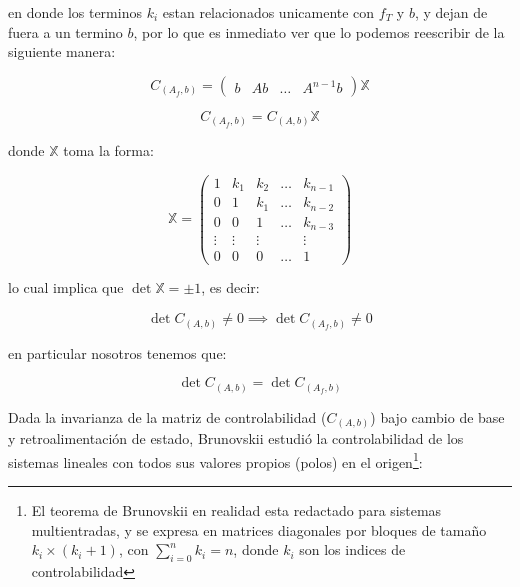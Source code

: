 \begin{enumerate}
                en donde los terminos $k_i$ estan relacionados unicamente con $f_T$ y $b$, y dejan de fuera a un termino $b$, por lo que es inmediato ver que lo podemos reescribir de la siguiente manera:

                \begin{equation*}
                    C_{(A_f, b)} =
                    \begin{pmatrix}
                    b & A b & \dots & A^{n-1} b
                    \end{pmatrix} \mathbb{X}
                \end{equation*}

                \begin{equation}
                    C_{(A_f, b)} = C_{(A, b)} \mathbb{X}
                \end{equation}

                donde $\mathbb{X}$ toma la forma:

                \begin{equation*}
                    \mathbb{X} =
                    \begin{pmatrix}
                        1 & k_1 & k_2 & \dots & k_{n-1} \\
                        0 & 1 & k_1 & \dots & k_{n-2} \\
                        0 & 0 & 1 & \dots & k_{n-3} \\
                        \vdots & \vdots & \vdots & & \vdots \\
                        0 & 0 & 0 & \dots & 1
                    \end{pmatrix}
                \end{equation*}

                lo cual implica que $\det{\mathbb{X}} = \pm 1$, es decir:

                \begin{equation*}
                    \det{C_{(A, b)}} \ne 0 \implies \det{C_{(A_f, b)}} \ne 0
                \end{equation*}

                en particular nosotros tenemos que:

                \begin{equation}
                    \det{C_{(A, b)}} = \det{C_{(A_f, b)}}
                \end{equation}

                Dada la invarianza de la matriz de controlabilidad ($C_{(A, b)}$) bajo cambio de base y retroalimentación de estado, Brunovskii estudió la controlabilidad de los sistemas lineales con todos sus valores propios (polos) en el origen\footnote{El teorema de Brunovskii en realidad esta redactado para sistemas multientradas, y se expresa en matrices diagonales por bloques de tamaño $k_i \times (k_i + 1)$, con $\sum_{i=0}^n k_i = n$, donde $k_i$ son los indices de controlabilidad}:


\end{enumerate}

